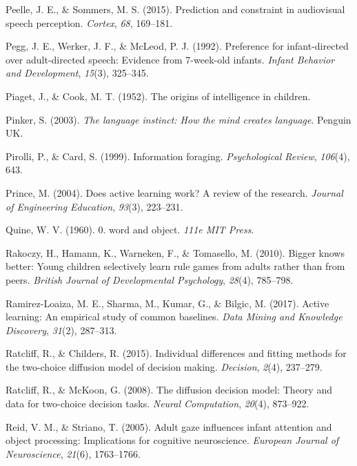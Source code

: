 \documentclass[oneside]{report}
\begin{document}
\hypertarget{ref-peelle2015prediction}{}
Peelle, J. E., \& Sommers, M. S. (2015). Prediction and constraint in
audiovisual speech perception. \emph{Cortex}, \emph{68}, 169--181.

\hypertarget{ref-pegg1992preference}{}
Pegg, J. E., Werker, J. F., \& McLeod, P. J. (1992). Preference for
infant-directed over adult-directed speech: Evidence from 7-week-old
infants. \emph{Infant Behavior and Development}, \emph{15}(3), 325--345.

\hypertarget{ref-piaget1952origins}{}
Piaget, J., \& Cook, M. T. (1952). The origins of intelligence in
children.

\hypertarget{ref-pinker2003language}{}
Pinker, S. (2003). \emph{The language instinct: How the mind creates
language}. Penguin UK.

\hypertarget{ref-pirolli1999information}{}
Pirolli, P., \& Card, S. (1999). Information foraging.
\emph{Psychological Review}, \emph{106}(4), 643.

\hypertarget{ref-prince2004does}{}
Prince, M. (2004). Does active learning work? A review of the research.
\emph{Journal of Engineering Education}, \emph{93}(3), 223--231.

\hypertarget{ref-quine19600}{}
Quine, W. V. (1960). 0. word and object. \emph{111e MIT Press}.

\hypertarget{ref-rakoczy2010bigger}{}
Rakoczy, H., Hamann, K., Warneken, F., \& Tomasello, M. (2010). Bigger
knows better: Young children selectively learn rule games from adults
rather than from peers. \emph{British Journal of Developmental
Psychology}, \emph{28}(4), 785--798.

\hypertarget{ref-ramirez2017active}{}
Ramirez-Loaiza, M. E., Sharma, M., Kumar, G., \& Bilgic, M. (2017).
Active learning: An empirical study of common baselines. \emph{Data
Mining and Knowledge Discovery}, \emph{31}(2), 287--313.

\hypertarget{ref-ratcliff2015individual}{}
Ratcliff, R., \& Childers, R. (2015). Individual differences and fitting
methods for the two-choice diffusion model of decision making.
\emph{Decision}, \emph{2}(4), 237--279.

\hypertarget{ref-ratcliff2008diffusion}{}
Ratcliff, R., \& McKoon, G. (2008). The diffusion decision model: Theory
and data for two-choice decision tasks. \emph{Neural Computation},
\emph{20}(4), 873--922.

\hypertarget{ref-reid2005adult}{}
Reid, V. M., \& Striano, T. (2005). Adult gaze influences infant
attention and object processing: Implications for cognitive
neuroscience. \emph{European Journal of Neuroscience}, \emph{21}(6),
1763--1766.
\end{document}
